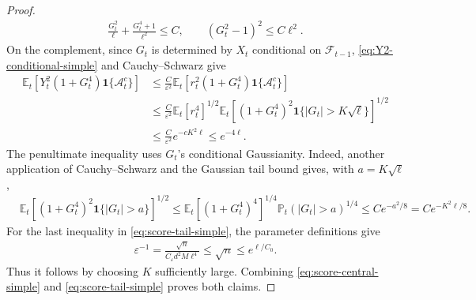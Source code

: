 \documentclass[11pt]{article}
\newcommand{\E}{\mathbb E}
\newcommand{\Pp}{\mathbb P}
\newcommand{\F}{\mathcal F}
\newcommand{\1}{\mathbf 1}
\newcommand{\eps}{\varepsilon}
\begin{document}
\begin{proof}
    \begin{align}
        \frac{G_t^2}{\ell}
        +\frac{G_t^4+1}{\ell^2}
        \leq C,
        \qquad
        (G_t^2-1)^2\leq C\ell^2.
        \label{eq:score-central-simple}
    \end{align}
    On the complement, since $G_t$ is determined by $X_t$ conditional on
    $\F_{t-1}$, \eqref{eq:Y2-conditional-simple} and Cauchy--Schwarz give
    \begin{align}
        \E_t\left[
            Y_t^2(1+G_t^4)\1\{\mathcal A_t^c\}
            \right]
         & \leq
        \frac{C}{\eps^2}
        \E_t\left[
            r_t^2(1+G_t^4)\1\{\mathcal A_t^c\}
            \right]
        \nonumber \\
         & \leq
        \frac{C}{\eps^2}
        \E_t[r_t^4]^{1/2}
        \E_t\left[
            (1+G_t^4)^2
            \1\{|G_t|>K\sqrt\ell\}
            \right]^{1/2}
        \nonumber \\
         & \leq
        \frac{C}{\eps^2}e^{-cK^2\ell}
        \leq e^{-4\ell}.
        \label{eq:score-tail-simple}
    \end{align}
    The penultimate inequality uses $G_t$'s conditional Gaussianity.  Indeed,
    another application of Cauchy--Schwarz and the Gaussian tail bound gives,
    with $a=K\sqrt\ell$,
    \begin{align}
         & \E_t\left[
            (1+G_t^4)^2\1\{|G_t|>a\}
            \right]^{1/2}
        \leq
        \E_t[(1+G_t^4)^4]^{1/4}
        \Pp_t(|G_t|>a)^{1/4}
        \leq
        Ce^{-a^2/8}
        =
        Ce^{-K^2\ell/8}.
    \end{align}
    For the last inequality in \eqref{eq:score-tail-simple}, the parameter
    definitions give
    \begin{align}
        \eps^{-1}
        =
        \frac{\sqrt n}{C_\eps d^2M\ell^4}
        \leq\sqrt n
        \leq e^{\ell/C_0}.
    \end{align}
    Thus it follows by choosing $K$ sufficiently large.
    Combining
    \eqref{eq:score-central-simple} and
    \eqref{eq:score-tail-simple} proves both claims.
\end{proof}
\end{document}
